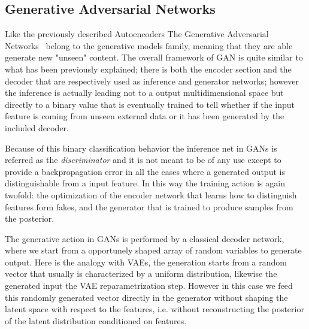 \subsection{Generative Adversarial Networks}
%
Like the previously described Autoencoders The Generative Adversarial Networks~\cite{goodfellow2014generative} belong to the generative models family, meaning that they are able generate new "unseen" content. The overall framework of GAN is quite similar to what has been previously explained; there is both the encoder section and the decoder that are respectively used as inference and generator networks; however the inference is actually leading not to a output multidimensional space but directly to a binary value that is eventually trained to tell whether if the input feature is coming from unseen external data or it has been generated by the included decoder.

Because of this binary classification behavior the inference net in GANs is referred as the \textit{discriminator} and it is not meant to be of any use except to provide a backpropagation error in all the cases where a generated output is distinguishable from a input feature. In this way the training action is again twofold: the optimization of the encoder network that learns how to distinguish features form fakes, and the generator that is trained to produce samples from the posterior.

The generative action in GANs is performed by a classical decoder network, where we start from a opportunely shaped array of random variables to generate output. Here is the analogy with VAEs, the generation starts from a random vector that usually is characterized by a uniform distribution, likewise the generated input the VAE reparametrization step. However in this case we feed this randomly generated vector directly in the generator without shaping the latent space with respect to the features, i.e. without reconstructing the posterior of the latent distribution conditioned on features.

